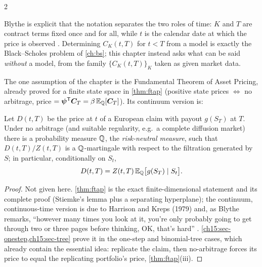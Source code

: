 \begin{paracol}{2}
\begin{finance}
Blythe is explicit that the notation separates the two roles of time: $K$ and $T$ are contract terms
fixed once and for all, while $t$ is the calendar date at which the price is observed
. Determining $C_K(t,T)$ for $t<T$ from a model is exactly the Black--Scholes problem
of \cref{ch:bs}; this chapter instead asks what can be said \emph{without} a model, from the family
$\{C_K(t,T)\}_{K}$ taken as given market data.
\end{finance}

The one assumption of the chapter is the Fundamental Theorem of Asset Pricing, already proved for a
finite state space in \cref{thm:ftap} (positive state prices $\Leftrightarrow$ no arbitrage, price
$=\bm\psi^{\mathsf T}\bm C_T=\beta\,\mathbb{E}_{\mathbb{Q}}[\bm C_T]$). Its continuum version is:

\begin{theorem}\label{ch22:thm-ftap}
Let $D(t,T)$ be the price at $t$ of a European claim with payout $g(S_T)$ at $T$. Under no arbitrage
(and suitable regularity, e.g.\ a complete diffusion market) there is a probability measure $\mathbb{Q}$, the
\emph{risk-neutral measure}, such that $D(t,T)/Z(t,T)$ is a $\mathbb{Q}$-martingale with respect to the
filtration generated by $S$; in particular, conditionally on $S_t$,
\begin{equation}\label{ch22:eq-ftap}
  D(t,T) = Z(t,T)\,\mathbb{E}_{\mathbb{Q}}\bigl[g(S_T)\mid S_t\bigr].
\end{equation}
\end{theorem}
\begin{proof}[Proof]
Not given here. \cref{thm:ftap} is the exact finite-dimensional statement and its complete proof
(Stiemke's lemma plus a separating hyperplane); the continuum, continuous-time version is due to
Harrison and Kreps (1979) and, as Blythe remarks, ``however many times you look at it, you're only
probably going to get through two or three pages before thinking, OK, that's hard''
. \cref{ch15:sec-onestep,ch15:sec-tree} prove it in the one-step and binomial-tree
cases, which already contain the essential idea: replicate the claim, then no-arbitrage forces its
price to equal the replicating portfolio's price, \cref{thm:ftap}(iii).
\end{proof}


\end{paracol}
